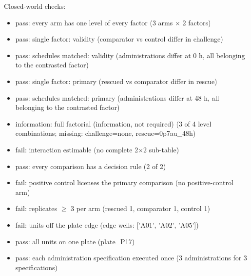\documentclass[10pt,a4paper]{article}
\begin{document}
\par\smallskip Closed-world checks:\begin{itemize}[nosep]
\item \textcolor{green!50!black}{pass}: every arm has one level of every factor (3 arms × 2 factors)
\item \textcolor{green!50!black}{pass}: single factor: validity (comparator vs control differ in challenge)
\item \textcolor{green!50!black}{pass}: schedules matched: validity (administrations differ at 0 h, all belonging to the contrasted factor)
\item \textcolor{green!50!black}{pass}: single factor: primary (rescued vs comparator differ in rescue)
\item \textcolor{green!50!black}{pass}: schedules matched: primary (administrations differ at 48 h, all belonging to the contrasted factor)
\item information: full factorial (information, not required) (3 of 4 level combinations; missing: challenge=none, rescue=0p7au\_48h)
\item \textcolor{red!70!black}{fail}: interaction estimable (no complete 2×2 sub-table)
\item \textcolor{green!50!black}{pass}: every comparison has a decision rule (2 of 2)
\item \textcolor{red!70!black}{fail}: positive control licenses the primary comparison (no positive-control arm)
\item \textcolor{red!70!black}{fail}: replicates $\geq$ 3 per arm (rescued 1, comparator 1, control 1)
\item \textcolor{red!70!black}{fail}: units off the plate edge (edge wells: ['A01', 'A02', 'A05'])
\item \textcolor{green!50!black}{pass}: all units on one plate (plate\_P17)
\item \textcolor{green!50!black}{pass}: each administration specification executed once (3 administrations for 3 specifications)
\end{itemize}
\end{document}
